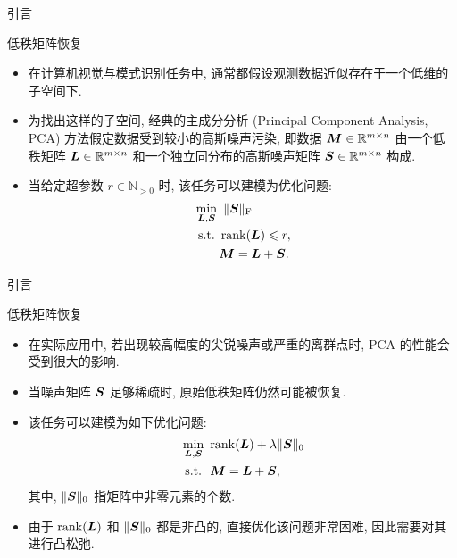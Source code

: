 \documentclass{beamer}
\begin{document}
\begin{frame}{引言}
  \begin{block}{低秩矩阵恢复}
    \begin{itemize}
      \item 在计算机视觉与模式识别任务中, 通常都假设观测数据近似存在于一个低维的子空间下.
      \item 为找出这样的子空间, 经典的主成分分析 (Principal Component Analysis, PCA) \cite{abdi2010principal} 方法假定数据受到较小的高斯噪声污染, 即数据 $\bm{M}\in\mathbb{R}^{m\times n}$ 由一个低秩矩阵 $\bm{L}\in\mathbb{R}^{m\times n}$ 和一个独立同分布的高斯噪声矩阵 $\bm{S}\in\mathbb{R}^{m\times n}$ 构成.
      \item 当给定超参数 $r\in\mathbb{N}_{>0}$ 时, 该任务可以建模为优化问题: 
      \begin{equation}
        \begin{aligned}
          &\min_{\bm{L},\bm{S}}~\|\bm{S}\|_{\text{F}} \\
          &~\text{s.t.}~\operatorname{rank}(\bm{L})\leqslant r,\\
          &\qquad \bm{M}=\bm{L}+\bm{S}.
        \end{aligned}
      \end{equation}
    \end{itemize}
  \end{block}
\end{frame}

\begin{frame}{引言}
  \begin{block}{低秩矩阵恢复}
    \begin{itemize}
      \item 在实际应用中, 若出现较高幅度的尖锐噪声或严重的离群点时, PCA 的性能会受到很大的影响.
      \item 当噪声矩阵 $\bm{S}$ 足够稀疏时, 原始低秩矩阵仍然可能被恢复.
      \item 该任务可以建模为如下优化问题: 
      \begin{equation}
        \begin{aligned}
          &\min_{\bm{L},\bm{S}}~\operatorname{rank}(\bm{L})+\lambda\|\bm{S}\|_0 \\
          &~\text{s.t.}~~\bm{M}=\bm{L}+\bm{S},
        \end{aligned}
      \end{equation}
      其中, $\|\bm{S}\|_0$ 指矩阵中非零元素的个数.
      \item 由于 $\operatorname{rank}(\bm{L})$ 和 $\|\bm{S}\|_0$ 都是非凸的, 直接优化该问题非常困难, 因此需要对其进行凸松弛. 
    \end{itemize}
  \end{block}
\end{frame}
\end{document}
